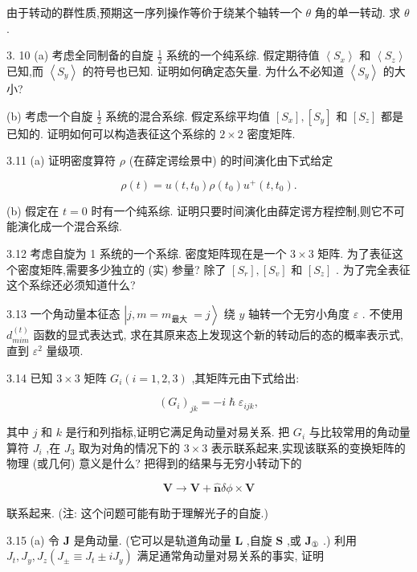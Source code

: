 由于转动的群性质,预期这一序列操作等价于绕某个轴转一个 $\theta$ 角的单一转动. 求 $\theta$ .

3. 10 (a) 考虑全同制备的自旋 $\frac{1}{2}$ 系统的一个纯系综. 假定期待值 $\left\langle {S}_{x}\right\rangle$ 和 $\left\langle {S}_{z}\right\rangle$ 已知,而 $\left\langle {S}_{y}\right\rangle$ 的符号也已知. 证明如何确定态矢量. 为什么不必知道 $\left\langle {S}_{y}\right\rangle$ 的大小?

(b) 考虑一个自旋 $\frac{1}{2}$ 系统的混合系综. 假定系综平均值 $\left\lbrack {S}_{x}\right\rbrack ,\left\lbrack {S}_{y}\right\rbrack$ 和 $\left\lbrack {S}_{z}\right\rbrack$ 都是已知的. 证明如何可以构造表征这个系综的 $2 \times 2$ 密度矩阵.

3.11 (a) 证明密度算符 $\rho$ (在薛定谔绘景中) 的时间演化由下式给定

$$
\rho \left( t\right) = u\left( {t,{t}_{0}}\right) \rho \left( {t}_{0}\right) {u}^{ + }\left( {t,{t}_{0}}\right) .
$$

(b) 假定在 $t = 0$ 时有一个纯系综. 证明只要时间演化由薛定谔方程控制,则它不可能演化成一个混合系综.

3.12 考虑自旋为 1 系统的一个系综. 密度矩阵现在是一个 $3 \times 3$ 矩阵. 为了表征这个密度矩阵,需要多少独立的 (实) 参量? 除了 $\left\lbrack {S}_{r}\right\rbrack ,\left\lbrack {S}_{v}\right\rbrack$ 和 $\left\lbrack {S}_{z}\right\rbrack$ . 为了完全表征这个系综还必须知道什么?

3.13 一个角动量本征态 $\left| {j, m = {m}_{\text{最大 }} = j}\right\rangle$ 绕 $y$ 轴转一个无穷小角度 $\varepsilon$ . 不使用 ${d}_{mim}^{\left( t\right) }$ 函数的显式表达式, 求在其原来态上发现这个新的转动后的态的概率表示式,直到 ${\varepsilon }^{2}$ 量级项.

3.14 已知 $3 \times 3$ 矩阵 ${G}_{i}\left( {i = 1,2,3}\right)$ ,其矩阵元由下式给出:

$$
{\left( {G}_{i}\right) }_{jk} = - i\hslash {\varepsilon }_{ijk},
$$

其中 $j$ 和 $k$ 是行和列指标,证明它满足角动量对易关系. 把 ${G}_{i}$ 与比较常用的角动量算符 ${J}_{i}$ ,在 ${J}_{3}$ 取为对角的情况下的 $3 \times 3$ 表示联系起来,实现该联系的变换矩阵的物理 (或几何) 意义是什么? 把得到的结果与无穷小转动下的

$$
\mathbf{V} \rightarrow \mathbf{V} + \widehat{\mathbf{n}}{\delta \phi } \times \mathbf{V}
$$

联系起来. (注: 这个问题可能有助于理解光子的自旋.)

3.15 (a) 令 $\mathbf{J}$ 是角动量. (它可以是轨道角动量 $\mathbf{L}$ ,自旋 $\mathbf{S}$ ,或 ${\mathbf{J}}_{\text{①}}$ .) 利用 ${J}_{t},{J}_{y},{J}_{z}\left( {{J}_{ \pm } \equiv {J}_{t} \pm i{J}_{y}}\right)$ 满足通常角动量对易关系的事实, 证明

